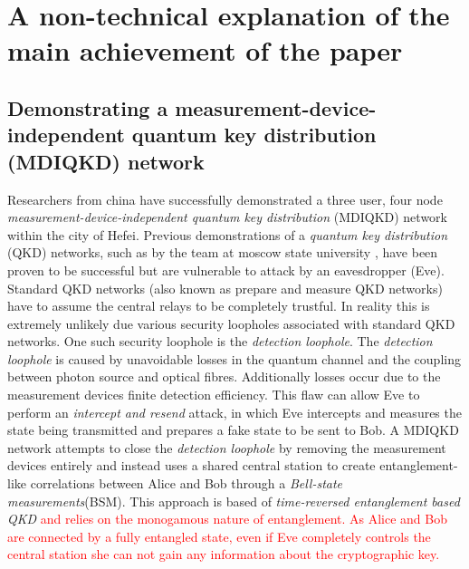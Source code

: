 \documentclass{article}
\begin{document}
\section*{A non-technical explanation of the main achievement of the paper}
\begin{mdframed}
\printnomenclature
\end{mdframed}

\subsection*{Demonstrating a measurement-device-independent quantum key distribution (MDIQKD) network}


Researchers from china have successfully demonstrated a three user, four node \textit{measurement-device-independent quantum key distribution} (MDIQKD) network within the city of Hefei. Previous demonstrations of a \textit{quantum key distribution} (QKD) networks, such as by the team at moscow state university\cite{2017QuEle..47..798K} , have been proven to be successful but are vulnerable to attack by an eavesdropper (Eve). Standard QKD networks (also known as prepare and measure QKD networks) have to assume the central relays to be completely trustful. In reality this is extremely unlikely due various security loopholes associated with standard QKD networks. One such security loophole is the \textit{detection loophole}. The \textit{detection loophole} is caused by unavoidable losses in the quantum channel and  the coupling between photon source and optical fibres. Additionally losses occur due to the measurement devices finite detection efficiency. This flaw can allow Eve to perform an \textit{intercept and resend} attack, in which Eve intercepts and measures the state being transmitted and prepares a fake state to be sent to Bob. A MDIQKD network attempts to close the \textit{detection loophole} by removing the measurement devices entirely and instead uses a shared  central station to create entanglement-like correlations between Alice and Bob through a \textit{Bell-state measurements}(BSM). This approach is based of \textit{time-reversed entanglement based QKD}\cite{PhysRevA.54.2651} \textcolor{red}{and relies on the monogamous nature of entanglement. As Alice and Bob are connected by a fully entangled state, even if Eve completely controls the central station she can not gain any information about the cryptographic key.}     
\end{document}
